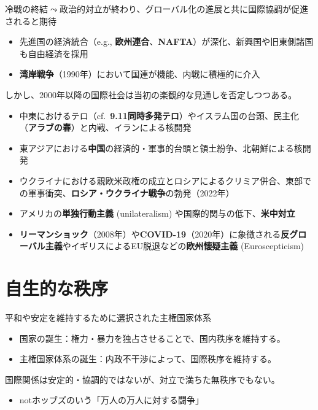 \documentclass[
  xelatex,
  ja=standard]{bxjsarticle}
\providecommand{\tightlist}{%
  \setlength{\itemsep}{0pt}\setlength{\parskip}{0pt}}\usepackage{longtable,booktabs,array}
\begin{document}
冷戦の終結\(\leadsto\)政治的対立が終わり、グローバル化の進展と共に国際協調が促進されると期待

\begin{itemize}
\tightlist
\item
  先進国の経済統合（e.g.,
  \textbf{欧州連合}、\textbf{NAFTA}）が深化、新興国や旧東側諸国も自由経済を採用
\item
  \textbf{湾岸戦争}（1990年）において国連が機能、内戦に積極的に介入
\end{itemize}

しかし、2000年以降の国際社会は当初の楽観的な見通しを否定しつつある。

\begin{itemize}
\tightlist
\item
  中東におけるテロ（cf.~\textbf{9.11同時多発テロ}）やイスラム国の台頭、民主化（\textbf{アラブの春}）と内戦、イランによる核開発
\item
  東アジアにおける\textbf{中国}の経済的・軍事的台頭と領土紛争、北朝鮮による核開発
\item
  ウクライナにおける親欧米政権の成立とロシアによるクリミア併合、東部での軍事衝突、\textbf{ロシア・ウクライナ戦争}の勃発（2022年）
\item
  アメリカの\textbf{単独行動主義} (unilateralism)
  や国際的関与の低下、\textbf{米中対立}
\item
  \textbf{リーマンショック}（2008年）や\textbf{COVID-19}（2020年）に象徴される\textbf{反グローバル主義}やイギリスによるEU脱退などの\textbf{欧州懐疑主義}
  (Euroscepticism)
\end{itemize}

\hypertarget{ux81eaux751fux7684ux306aux79e9ux5e8f}{%
\section{自生的な秩序}\label{ux81eaux751fux7684ux306aux79e9ux5e8f}}

平和や安定を維持するために選択された主権国家体系

\begin{itemize}
\tightlist
\item
  国家の誕生：権力・暴力を独占させることで、国内秩序を維持する。
\item
  主権国家体系の誕生：内政不干渉によって、国際秩序を維持する。
\end{itemize}

国際関係は安定的・協調的ではないが、対立で満ちた無秩序でもない。

\begin{itemize}
\tightlist
\item
  notホッブズのいう「万人の万人に対する闘争」
\end{itemize}
\end{document}
